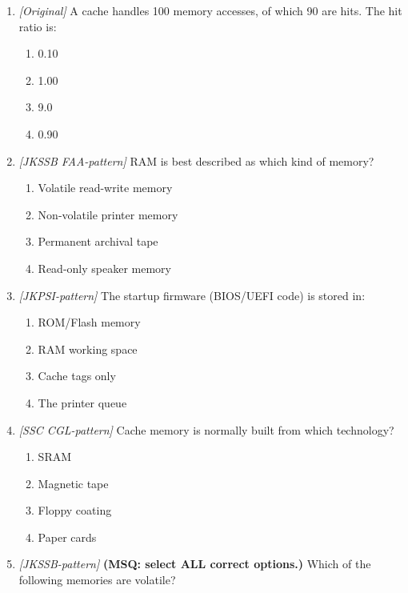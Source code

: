\documentclass[11pt]{article}
\begin{document}
\begin{enumerate}[label=\textbf{Q\arabic*.}, leftmargin=*]
\begin{enumerate}[label=\Alph*.]
    \item data is written to ROM
    \item the required data is not found in the cache
    \item the cache is powered off
  \end{enumerate}
\item \textit{[Original]} A cache handles 100 memory accesses, of which 90
  are hits. The hit ratio is:
  \begin{enumerate}[label=\Alph*.]
    \item 0.10
    \item 1.00
    \item 9.0
    \item 0.90
  \end{enumerate}

\item \textit{[JKSSB FAA-pattern]} RAM is best described as which kind of memory?
  \begin{enumerate}[label=\Alph*.]
    \item Volatile read-write memory
    \item Non-volatile printer memory
    \item Permanent archival tape
    \item Read-only speaker memory
  \end{enumerate}
\item \textit{[JKPSI-pattern]} The startup firmware (BIOS/UEFI code) is stored in:
  \begin{enumerate}[label=\Alph*.]
    \item ROM/Flash memory
    \item RAM working space
    \item Cache tags only
    \item The printer queue
  \end{enumerate}
\item \textit{[SSC CGL-pattern]} Cache memory is normally built from which technology?
  \begin{enumerate}[label=\Alph*.]
    \item SRAM
    \item Magnetic tape
    \item Floppy coating
    \item Paper cards
  \end{enumerate}
\item \textit{[JKSSB-pattern]} \textbf{(MSQ: select ALL correct options.)} Which of the following memories are volatile?
  \begin{enumerate}[label=\Alph*.]

\end{enumerate}
\end{enumerate}
\end{document}
